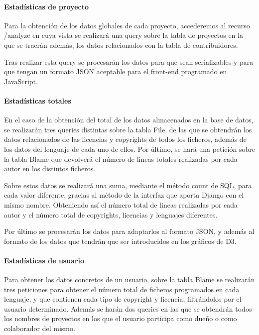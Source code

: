 \documentclass[a4paper, spanish, 12pt]{book}
\begin{document}
\paragraph*{Estad\'isticas de proyecto}
\label{paragraph:project_stats}

Para la obtenci\'on de los datos globales de cada proyecto, accederemos al recurso
/analyze en cuya vista se realizar\'a una query sobre la tabla de proyectos en la
que se traer\'an adem\'as, los datos relacionados con la tabla de contribuidores.

Tras realizar esta query se procesar\'an los datos para que sean serializables
y para que tengan un formato JSON aceptable para el front-end programado en JavaScript.

\paragraph*{Estad\'isticas totales}
\label{paragraph:total_stats}

En el caso de la obtenci\'on del total de los datos almacenados en la base de datos,
se realizar\'an tres queries distintas sobre la tabla File, de las que se obtendr\'an
los datos relacionados de las licencias y copyrights de todos los ficheros, adem\'as
de los datos del lenguaje de cada uno de ellos. Por \'ultimo, se har\'a una petici\'on sobre
la tabla Blame que devolver\'a el n\'umero de lineas totales realizadas por cada autor en
los distintos ficheros.

Sobre estos datos se realizar\'a una suma, mediante el m\'etodo count de SQL, para cada valor diferente,
gracias al m\'etodo de la interfaz que aporta Django con el mismo nombre. Obteniendo
as\'i el n\'umero total de lineas realizadas por cada autor y el n\'umero total de
copyrights, licencias y lenguajes diferentes.

Por \'ultimo se procesar\'an los datos para adaptarlos al formato JSON, y adem\'as
al formato de los datos que tendr\'an que ser introducidos en los gr\'aficos de D3.

\paragraph*{Estad\'isticas de usuario}
\label{paragraph:user_stats}

Para obtener los datos concretos de un usuario, sobre la tabla Blame se realizar\'an
tres peticiones para obtener el n\'umero total de ficheros programados en cada lenguaje,
y que contienen cada tipo de copyright y licencia, filtr\'andolos por el usuario determinado.
Adem\'as se har\'an dos queries en las que se obtendr\'an todos los nombres de proyectos
en los que el usuario participa como due\~no o como colaborador del mismo.
\end{document}
